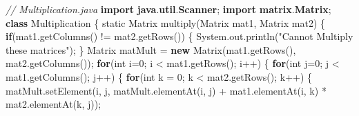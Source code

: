 \documentclass[
  12pt,
]{article}
\newenvironment{Shaded}{}{}
\newcommand{\BuiltInTok}[1]{\textcolor[rgb]{0.00,0.50,0.00}{#1}}
\newcommand{\CommentTok}[1]{\textcolor[rgb]{0.38,0.63,0.69}{\textit{#1}}}
\newcommand{\ControlFlowTok}[1]{\textcolor[rgb]{0.00,0.44,0.13}{\textbf{#1}}}
\newcommand{\DataTypeTok}[1]{\textcolor[rgb]{0.56,0.13,0.00}{#1}}
\newcommand{\DecValTok}[1]{\textcolor[rgb]{0.25,0.63,0.44}{#1}}
\newcommand{\FunctionTok}[1]{\textcolor[rgb]{0.02,0.16,0.49}{#1}}
\newcommand{\ImportTok}[1]{\textcolor[rgb]{0.00,0.50,0.00}{\textbf{#1}}}
\newcommand{\KeywordTok}[1]{\textcolor[rgb]{0.00,0.44,0.13}{\textbf{#1}}}
\newcommand{\NormalTok}[1]{#1}
\newcommand{\OperatorTok}[1]{\textcolor[rgb]{0.40,0.40,0.40}{#1}}
\newcommand{\StringTok}[1]{\textcolor[rgb]{0.25,0.44,0.63}{#1}}
\begin{document}
\begin{Shaded}
\begin{Highlighting}[numbers=left,,]
\CommentTok{// Multiplication.java}
\KeywordTok{import} \ImportTok{java}\OperatorTok{.}\ImportTok{util}\OperatorTok{.}\ImportTok{Scanner}\OperatorTok{;}
\KeywordTok{import} \ImportTok{matrix}\OperatorTok{.}\ImportTok{Matrix}\OperatorTok{;}
\KeywordTok{class}\NormalTok{ Multiplication}
\OperatorTok{\{}
    \DataTypeTok{static}\NormalTok{ Matrix }\FunctionTok{multiply}\OperatorTok{(}\NormalTok{Matrix mat1}\OperatorTok{,}\NormalTok{ Matrix mat2}\OperatorTok{)}
    \OperatorTok{\{}
        \ControlFlowTok{if}\OperatorTok{(}\NormalTok{mat1}\OperatorTok{.}\FunctionTok{getColumns}\OperatorTok{()} \OperatorTok{!=}\NormalTok{ mat2}\OperatorTok{.}\FunctionTok{getRows}\OperatorTok{())}
        \OperatorTok{\{}
            \BuiltInTok{System}\OperatorTok{.}\FunctionTok{out}\OperatorTok{.}\FunctionTok{println}\OperatorTok{(}\StringTok{"Cannot Multiply these matrices"}\OperatorTok{);}
        \OperatorTok{\}}
\NormalTok{        Matrix matMult }\OperatorTok{=} \KeywordTok{new} \FunctionTok{Matrix}\OperatorTok{(}\NormalTok{mat1}\OperatorTok{.}\FunctionTok{getRows}\OperatorTok{(),}\NormalTok{ mat2}\OperatorTok{.}\FunctionTok{getColumns}\OperatorTok{());}
        \ControlFlowTok{for}\OperatorTok{(}\DataTypeTok{int}\NormalTok{ i}\OperatorTok{=}\DecValTok{0}\OperatorTok{;}\NormalTok{ i }\OperatorTok{\textless{}}\NormalTok{ mat1}\OperatorTok{.}\FunctionTok{getRows}\OperatorTok{();}\NormalTok{ i}\OperatorTok{++)}
        \OperatorTok{\{}
            \ControlFlowTok{for}\OperatorTok{(}\DataTypeTok{int}\NormalTok{ j}\OperatorTok{=}\DecValTok{0}\OperatorTok{;}\NormalTok{ j }\OperatorTok{\textless{}}\NormalTok{ mat1}\OperatorTok{.}\FunctionTok{getColumns}\OperatorTok{();}\NormalTok{ j}\OperatorTok{++)}
            \OperatorTok{\{}
                \ControlFlowTok{for}\OperatorTok{(}\DataTypeTok{int}\NormalTok{ k }\OperatorTok{=} \DecValTok{0}\OperatorTok{;}\NormalTok{ k }\OperatorTok{\textless{}}\NormalTok{ mat2}\OperatorTok{.}\FunctionTok{getRows}\OperatorTok{();}\NormalTok{ k}\OperatorTok{++)}
                \OperatorTok{\{}
\NormalTok{                    matMult}\OperatorTok{.}\FunctionTok{setElement}\OperatorTok{(}\NormalTok{i}\OperatorTok{,}\NormalTok{ j}\OperatorTok{,}\NormalTok{ matMult}\OperatorTok{.}\FunctionTok{elementAt}\OperatorTok{(}\NormalTok{i}\OperatorTok{,}\NormalTok{ j}\OperatorTok{)} \OperatorTok{+}\NormalTok{ mat1}\OperatorTok{.}\FunctionTok{elementAt}\OperatorTok{(}\NormalTok{i}\OperatorTok{,}\NormalTok{ k}\OperatorTok{)} \OperatorTok{*}\NormalTok{ mat2}\OperatorTok{.}\FunctionTok{elementAt}\OperatorTok{(}\NormalTok{k}\OperatorTok{,}\NormalTok{ j}\OperatorTok{));}

\end{Highlighting}
\end{Shaded}
\end{document}
